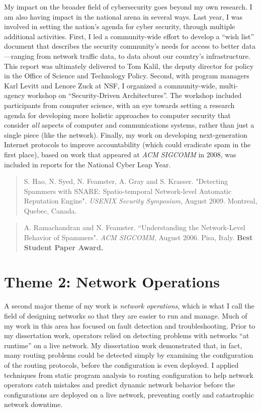 My impact on the broader field of cybersecurity goes beyond my own
research.  I am also having impact in the national arena in several
ways.  Last year, I was involved in setting the nation's agenda for
cyber security, through multiple additional activities.  First, I led a
community-wide effort to develop a ``wish list'' document that describes
the security community's needs for access to better data---ranging from
network traffic data, to data about our country's infrastructure.  This
report was ultimately delivered to Tom Kalil, the deputy director for
policy in the Office of Science and Technology Policy.  Second, with
program managers Karl Levitt and Lenore Zuck at NSF, I organized a
community-wide, multi-agency workshop on ``Security-Driven
Architectures''.  The workshop included participants from computer
science, with an eye towards setting a research agenda for developing
more holistic approaches to computer security that consider {\em all}
aspects of computer and communications systems, rather than just a
single piece (like the network).  Finally, my work on developing
next-generation Internet protocols to improve accountability (which
could eradicate spam in the first place), based on work that appeared at
{\em ACM SIGCOMM} in 2008, was included in reports for the
National Cyber Leap Year.

\begin{quote}
S. Hao, N. Syed, N. Feamster, A. Gray and S. Krasser. "Detecting
Spammers with SNARE: Spatio-temporal Network-level Automatic Reputation
Engine". {\em USENIX Security Symposium}, August 2009. Montreal, Quebec,
Canada. 
\end{quote}

\begin{quote}
A. Ramachandran and N. Feamster. ``Understanding the Network-Level
Behavior of Spammers". {\em ACM SIGCOMM}, August 2006. Pisa, Italy. {\bf
Best Student Paper Award.}
\end{quote}


\section*{Theme 2: Network Operations}

A second major theme of my work is {\em network operations}, which is
what I call the field of designing networks so that they are easier to
run and manage.  Much of my work in this area has focused on fault
detection and troubleshooting.  Prior to my dissertation work, operators
relied on detecting problems with networks ``at runtime'' on a live
network.  My dissertation work demonstrated that, in fact, many routing
problems could be detected simply by examining the configuration of the
routing protocols, before the configuration is even deployed.  I applied
techniques from static program analysis to routing configuration to help
network operators catch mistakes and predict dynamic network behavior
before the configurations are deployed on a live network, preventing
costly and catastrophic network downtime.

